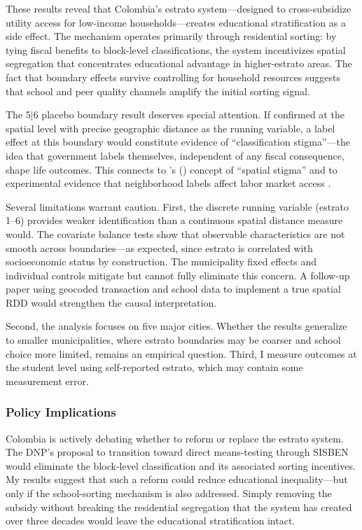 \documentclass[12pt]{article}
\begin{document}
These results reveal that Colombia's estrato system---designed to cross-subsidize utility access for low-income households---creates educational stratification as a side effect. The mechanism operates primarily through residential sorting: by tying fiscal benefits to block-level classifications, the system incentivizes spatial segregation that concentrates educational advantage in higher-estrato areas. The fact that boundary effects survive controlling for household resources suggests that school and peer quality channels amplify the initial sorting signal.

The 5$|$6 placebo boundary result deserves special attention. If confirmed at the spatial level with precise geographic distance as the running variable, a label effect at this boundary would constitute evidence of ``classification stigma''---the idea that government labels themselves, independent of any fiscal consequence, shape life outcomes. This connects to \citeauthor{sampson2012great}'s (\citeyear{sampson2012great}) concept of ``spatial stigma'' and to experimental evidence that neighborhood labels affect labor market access \citep{bertrand2004emily}.

Several limitations warrant caution. First, the discrete running variable (estrato 1--6) provides weaker identification than a continuous spatial distance measure would. The covariate balance tests show that observable characteristics are not smooth across boundaries---as expected, since estrato is correlated with socioeconomic status by construction. The municipality fixed effects and individual controls mitigate but cannot fully eliminate this concern. A follow-up paper using geocoded transaction and school data to implement a true spatial RDD would strengthen the causal interpretation.

Second, the analysis focuses on five major cities. Whether the results generalize to smaller municipalities, where estrato boundaries may be coarser and school choice more limited, remains an empirical question. Third, I measure outcomes at the student level using self-reported estrato, which may contain some measurement error.

\subsubsection*{Policy Implications} Colombia is actively debating whether to reform or replace the estrato system. The DNP's \citeyear{dnp2020estratos} proposal to transition toward direct means-testing through SISBEN would eliminate the block-level classification and its associated sorting incentives. My results suggest that such a reform could reduce educational inequality---but only if the school-sorting mechanism is also addressed. Simply removing the subsidy without breaking the residential segregation that the system has created over three decades would leave the educational stratification intact.
\end{document}
